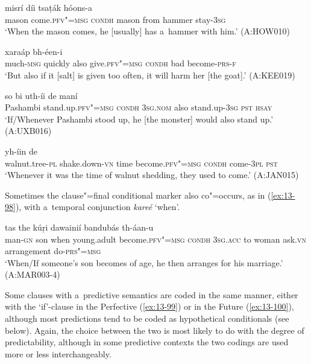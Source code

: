 \begin{exe}
\ex
\label{ex:13-94}
 misrí díi tsaṭák hóons-a \\
mason come.\textsc{pfv"=msg} \textsc{condh} mason from hammer stay-\textsc{3sg}  \\
\glt `When the mason comes, he [usually] has a~hammer with him.' (A:HOW010)

\ex
\label{ex:13-95}
 xaraáp  bh-éen-i \\
much-\textsc{msg} quickly also give.\textsc{pfv"=msg} \textsc{condh} bad  become-\textsc{prs-f}   \\
\glt `But also if it [salt] is given too often, it will harm her [the goat].' (A:KEE019)

\ex
\label{ex:13-96}
 so bi  uth-íi de maní \\
Pashambi stand.up.\textsc{pfv"=msg} \textsc{condh} \textsc{3sg.nom} also stand.up-\textsc{3sg} \textsc{pst} \textsc{hsay}  \\
\glt `If/Whenever Pashambi stood up, he [the monster] would also stand up.' (A:UXB016)

\ex
\label{ex:13-97}
\gll [ac̣húuṛi-m ṭhak"=ainií waxt bhíl-u seentá]  yh-íin de \\
walnut.tree-\textsc{pl} shake.down-\textsc{vn} time become.\textsc{pfv"=msg} \textsc{condh} come-\textsc{3pl} \textsc{ pst}    \\
\glt `Whenever it was the time of walnut shedding, they used to come.' (A:JAN015) 
\end{exe}

Sometimes the clause"=final conditional marker also co"=occurs, as in (\ref{ex:13-98}), with a~temporal conjunction \textit{kareé} `when'. 

\begin{exe}
\ex
\label{ex:13-98}
  tas the kúṛi dawainií
bandubás  th-áan-u \\
man-\textsc{gn} son when young.adult become.\textsc{pfv"=msg} \textsc{condh} \textsc{3sg.acc} to woman ask.\textsc{vn} arrangement do-\textsc{prs"=msg}  \\
\glt `When/If someone's son becomes of age, he then arranges for his marriage.' (A:MAR003-4) 
\end{exe}

Some clauses with a~predictive semantics are coded in the same manner, either with the `if'-clause in the Perfective (\ref{ex:13-99}) or in the Future (\ref{ex:13-100}), although most predictions tend to be coded as hypothetical conditionals (see below). Again, the choice between the two is most likely to do with the degree of predictability, although in some predictive contexts the two codings are used more or less interchangeably.

